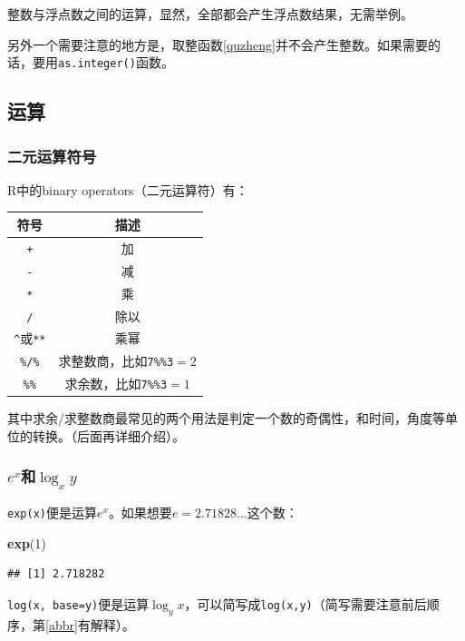 \documentclass[]{book}
\newenvironment{Shaded}{\begin{snugshade}}{\end{snugshade}}
\newcommand{\DecValTok}[1]{\textcolor[rgb]{0.00,0.00,0.81}{#1}}
\newcommand{\KeywordTok}[1]{\textcolor[rgb]{0.13,0.29,0.53}{\textbf{#1}}}
\newcommand{\NormalTok}[1]{#1}
\begin{document}
整数与浮点数之间的运算，显然，全部都会产生浮点数结果，无需举例。

另外一个需要注意的地方是，取整函数\ref{quzheng}并不会产生整数。如果需要的话，要用\texttt{as.integer()}函数。

\hypertarget{arithmetic}{%
\subsection{运算}\label{arithmetic}}

\subsubsection{二元运算符号}

R中的binary operators（二元运算符）有：

\begin{longtable}[]{@{}cc@{}}
\toprule
符号 & 描述\tabularnewline
\midrule
\endhead
\texttt{+} & 加\tabularnewline
\texttt{-} & 减\tabularnewline
\texttt{*} & 乘\tabularnewline
\texttt{/} & 除以\tabularnewline
\texttt{\^{}}或\texttt{**} & 乘幂\tabularnewline
\texttt{\%/\%} & 求整数商，比如\texttt{7\%\%3}\(=2\)\tabularnewline
\texttt{\%\%} & 求余数，比如\texttt{7\%\%3}\(=1\)\tabularnewline
\bottomrule
\end{longtable}

其中求余/求整数商最常见的两个用法是判定一个数的奇偶性，和时间，角度等单位的转换。（后面再详细介绍）。

\hypertarget{exlog_xy}{%
\subsubsection{\texorpdfstring{\(e^x\)和\(\log_x{y}\)}{e\^{}x和\textbackslash{}log\_x\{y\}}}\label{exlog_xy}}

\texttt{exp(x)}便是运算\(e^x\)。如果想要\(e=2.71828...\)这个数：

\begin{Shaded}
\begin{Highlighting}[]
\KeywordTok{exp}\NormalTok{(}\DecValTok{1}\NormalTok{)}
\end{Highlighting}
\end{Shaded}

\begin{verbatim}
## [1] 2.718282
\end{verbatim}

\texttt{log(x,\ base=y)}便是运算\(\log_y{x}\)，可以简写成\texttt{log(x,y)}（简写需要注意前后顺序，第\ref{abbr}有解释）。
\end{document}
